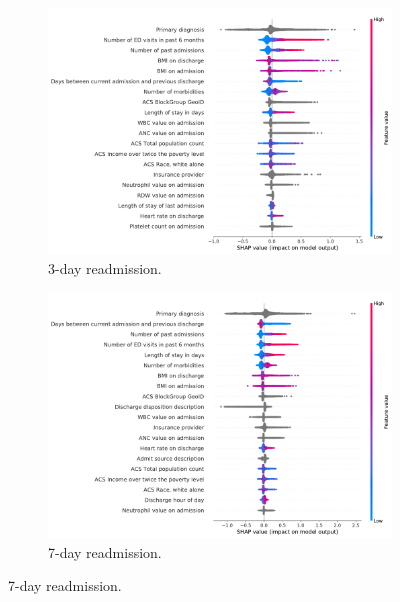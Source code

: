 \begin{figure}
\begin{adjustbox}{minipage=1.0\linewidth,frame}
\vspace{2.5mm}
\centering

\begin{subfigure}[t]{.45\linewidth}
    \centering
    \captionsetup[subfigure]{}
    \caption{3-day readmission.}\label{fig:shaprdt3d}
    \includegraphics[width=\linewidth,keepaspectratio]{supplementary/readmitted3d_SHAP_summary.pdf}
\end{subfigure}%
\begin{subfigure}[t]{.45\linewidth}
    \centering
    \captionsetup[subfigure]{}
    \caption{7-day readmission.}\label{fig:shaprdt7d}
    \includegraphics[width=\linewidth,keepaspectratio]{supplementary/readmitted7d_SHAP_summary.pdf}
\end{subfigure}%


\end{adjustbox}
\end{figure}

